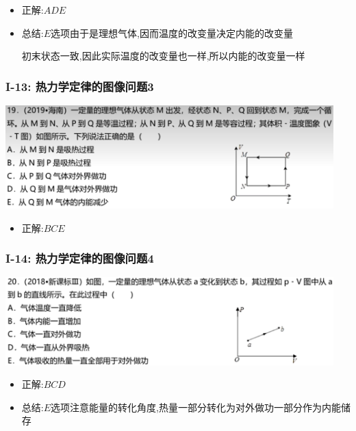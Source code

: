 \documentclass{article}
\begin{document}
\begin{itemize}
    \item 正解:\quad $ADE$
    \item 总结:\quad $E$选项由于是理想气体,因而温度的改变量决定内能的改变量
    
    \hspace{2.7em}初末状态一致,因此实际温度的改变量也一样,所以内能的改变量一样
\end{itemize}

\vspace{2em}

\subsubsection{I-13: 热力学定律的图像问题3}
\includegraphics[width = 0.95\textwidth,keepaspectratio]{./pictures/2.3-35.png}

\begin{itemize}
    \item 正解:\quad $BCE$
\end{itemize}

\vspace{2em}

\subsubsection{I-14: 热力学定律的图像问题4}
\includegraphics[width = 0.95\textwidth,keepaspectratio]{./pictures/2.3-36.png}

\begin{itemize}
    \item 正解:\quad $BCD$
    \item 总结:\quad $E$选项注意能量的转化角度,热量一部分转化为对外做功一部分作为内能储存
\end{itemize}
\end{document}
